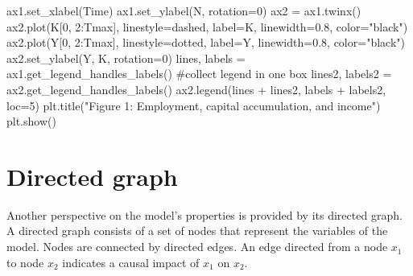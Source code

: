 \documentclass[
  letterpaper,
  DIV=11,
  numbers=noendperiod]{scrreprt}
\newenvironment{Shaded}{\begin{snugshade}}{\end{snugshade}}
\newcommand{\CommentTok}[1]{\textcolor[rgb]{0.37,0.37,0.37}{#1}}
\newcommand{\DecValTok}[1]{\textcolor[rgb]{0.68,0.00,0.00}{#1}}
\newcommand{\FloatTok}[1]{\textcolor[rgb]{0.68,0.00,0.00}{#1}}
\newcommand{\NormalTok}[1]{\textcolor[rgb]{0.00,0.23,0.31}{#1}}
\newcommand{\OperatorTok}[1]{\textcolor[rgb]{0.37,0.37,0.37}{#1}}
\newcommand{\StringTok}[1]{\textcolor[rgb]{0.13,0.47,0.30}{#1}}
\begin{document}
\begin{tcolorbox}
\begin{Shaded}
\begin{Highlighting}[]
\NormalTok{ax1.set\_xlabel(}\StringTok{\textquotesingle{}Time\textquotesingle{}}\NormalTok{)}
\NormalTok{ax1.set\_ylabel(}\StringTok{\textquotesingle{}N\textquotesingle{}}\NormalTok{, rotation}\OperatorTok{=}\DecValTok{0}\NormalTok{)}
\NormalTok{ax2 }\OperatorTok{=}\NormalTok{ ax1.twinx()}
\NormalTok{ax2.plot(K[}\DecValTok{0}\NormalTok{, }\DecValTok{2}\NormalTok{:Tmax], linestyle}\OperatorTok{=}\StringTok{\textquotesingle{}dashed\textquotesingle{}}\NormalTok{, label}\OperatorTok{=}\StringTok{\textquotesingle{}K\textquotesingle{}}\NormalTok{, linewidth}\OperatorTok{=}\FloatTok{0.8}\NormalTok{, color}\OperatorTok{=}\StringTok{"black"}\NormalTok{)}
\NormalTok{ax2.plot(Y[}\DecValTok{0}\NormalTok{, }\DecValTok{2}\NormalTok{:Tmax], linestyle}\OperatorTok{=}\StringTok{\textquotesingle{}dotted\textquotesingle{}}\NormalTok{, label}\OperatorTok{=}\StringTok{\textquotesingle{}Y\textquotesingle{}}\NormalTok{, linewidth}\OperatorTok{=}\FloatTok{0.8}\NormalTok{, color}\OperatorTok{=}\StringTok{"black"}\NormalTok{)}
\NormalTok{ax2.set\_ylabel(}\StringTok{\textquotesingle{}Y, K\textquotesingle{}}\NormalTok{, rotation}\OperatorTok{=}\DecValTok{0}\NormalTok{)}
\NormalTok{lines, labels }\OperatorTok{=}\NormalTok{ ax1.get\_legend\_handles\_labels() }\CommentTok{\#collect legend in one box}
\NormalTok{lines2, labels2 }\OperatorTok{=}\NormalTok{ ax2.get\_legend\_handles\_labels()}
\NormalTok{ax2.legend(lines }\OperatorTok{+}\NormalTok{ lines2, labels }\OperatorTok{+}\NormalTok{ labels2, loc}\OperatorTok{=}\DecValTok{5}\NormalTok{)}
\NormalTok{plt.title(}\StringTok{"Figure 1: Employment, capital accumulation, and income"}\NormalTok{)}
\NormalTok{plt.show()}
\end{Highlighting}
\end{Shaded}

\end{tcolorbox}

\section{Directed graph}\label{directed-graph-10}

Another perspective on the model's properties is provided by its
directed graph. A directed graph consists of a set of nodes that
represent the variables of the model. Nodes are connected by directed
edges. An edge directed from a node \(x_1\) to node \(x_2\) indicates a
causal impact of \(x_1\) on \(x_2\).
\end{document}

